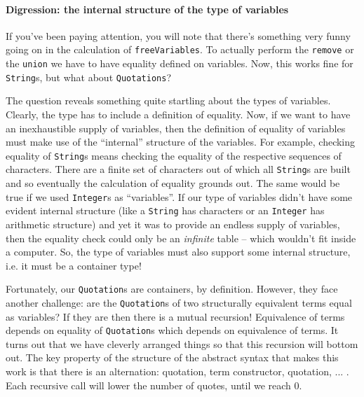 \paragraph{Digression: the internal structure of the type of variables}
If you've been paying attention, you will note that there's something
very funny going on in the calculation of
\lstinline[language=Scala]!freeVariables!. To actually perform the
\lstinline[language=Scala]!remove! or the
\lstinline[language=Scala]!union! we have to have equality defined on
variables. Now, this works fine for
\lstinline[language=Scala]!String!s, but what about
\lstinline[language=Scala]!Quotations!?

The question reveals something quite startling about the types of
variables. Clearly, the type has to include a definition of
equality. Now, if we want to have an inexhaustible supply of
variables, then the definition of equality of variables must make use
of the ``internal'' structure of the variables. For example, checking
equality of \lstinline[language=Scala]!String!s means checking the
equality of the respective sequences of characters. There are a finite
set of characters out of which all \lstinline[language=Scala]!String!s
are built and so eventually the calculation of equality grounds
out. The same would be true if we used
\lstinline[language=Scala]!Integer!s as ``variables''. If our type of
variables didn't have some evident internal structure (like a
\lstinline[language=Scala]!String! has characters or an
\lstinline[language=Scala]!Integer! has arithmetic structure) and yet
it was to provide an endless supply of variables, then the equality
check could only be an \emph{infinite} table -- which wouldn't fit
inside a computer. So, the type of variables must also support some
internal structure, i.e. it must be a container type!

Fortunately, our \lstinline[language=Scala]!Quotation!s are
containers, by definition. However, they face another challenge: are
the \lstinline[language=Scala]!Quotation!s of two structurally
equivalent terms equal as variables? If they are then there is a
mutual recursion! Equivalence of terms depends on equality of
\lstinline[language=Scala]!Quotation!s which depends on equivalence of
terms. It turns out that we have cleverly arranged things so that this
recursion will bottom out. The key property of the structure of the
abstract syntax that makes this work is that there is an alternation:
quotation, term constructor, quotation, ... . Each recursive call will
lower the number of quotes, until we reach 0.

